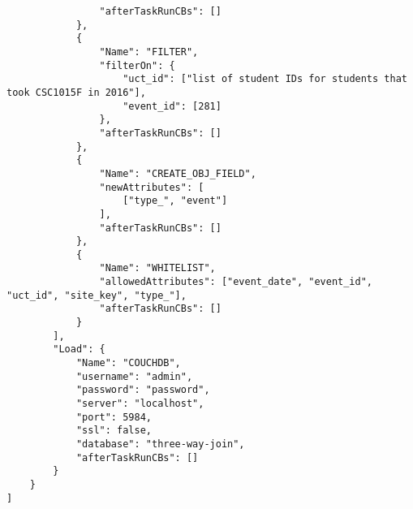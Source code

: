 \begin{verbatim}
                "afterTaskRunCBs": []
            },
            {
                "Name": "FILTER",
                "filterOn": {
                    "uct_id": ["list of student IDs for students that took CSC1015F in 2016"],
                    "event_id": [281]
                },
                "afterTaskRunCBs": []
            },
            {
                "Name": "CREATE_OBJ_FIELD",
                "newAttributes": [
                    ["type_", "event"]
                ],
                "afterTaskRunCBs": []
            },
            {
                "Name": "WHITELIST",
                "allowedAttributes": ["event_date", "event_id", "uct_id", "site_key", "type_"],
                "afterTaskRunCBs": []
            }
        ],
        "Load": {
            "Name": "COUCHDB",
            "username": "admin",
            "password": "password",
            "server": "localhost",
            "port": 5984,
            "ssl": false,
            "database": "three-way-join",
            "afterTaskRunCBs": []
        }
    }
]
\end{verbatim}